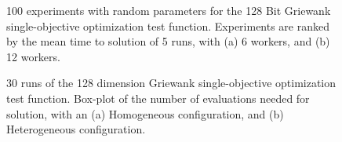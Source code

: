 \documentclass{llncs}
\begin{document}
\begin{figure}[b]
    \centering

    \caption{100 experiments with random parameters for the 128 Bit Griewank 
    single-objective optimization test function. Experiments are ranked by 
    the mean time to solution of 5 runs, with (a) 6 workers, and (b) 12 workers.}
    \label{fig:griewank}
\end{figure}


\begin{figure}[b]
    \centering
      \caption{30 runs of the 128 dimension Griewank single-objective optimization test function. 
    Box-plot of the number of evaluations needed for solution, with an (a) Homogeneous configuration, and (b) Heterogeneous configuration.}
    \label{fig:griewank-evals}
\end{figure}
\end{document}
